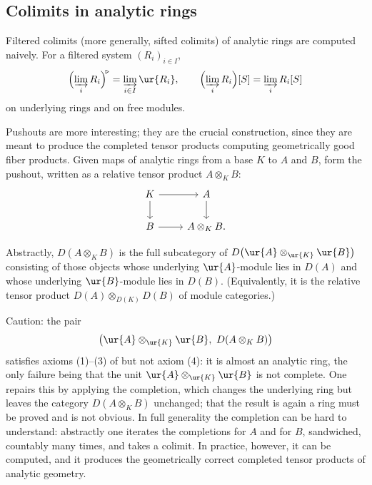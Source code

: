 \subsection{Colimits in analytic rings}

\begin{proposition}
\label{prop:1:filtered-colimits}
Filtered colimits (more generally, sifted colimits) of analytic rings are
computed naively. For a filtered system $(R_i)_{i\in I}$,
\begin{equation*}
\Bigl(\varinjlim_i R_i\Bigr)^{\!\triangleright}=\varinjlim_{i\in I}\ur{R_i},
\qquad
\Bigl(\varinjlim_i R_i\Bigr)[S]=\varinjlim_i R_i[S]
\end{equation*}
on underlying rings and on free modules.
\end{proposition}

Pushouts are more interesting; they are the crucial construction, since they are
meant to produce the completed tensor products computing geometrically good fiber
products. Given maps of analytic rings from a base $K$ to $A$ and $B$, form the
pushout, written as a relative tensor product $A\otimes_K B$:
\[
\begin{tikzcd}
K \arrow[r] \arrow[d] & A \arrow[d] \\
B \arrow[r] & A\otimes_K B.
\end{tikzcd}
\]

\begin{proposition}
\label{prop:1:pushout-derived-category}
Abstractly, $D(A\otimes_K B)$ is the full subcategory of
$D\bigl(\ur{A}\otimes_{\ur{K}}\ur{B}\bigr)$ consisting of those objects whose
underlying $\ur{A}$-module lies in $D(A)$ and whose underlying $\ur{B}$-module
lies in $D(B)$. (Equivalently, it is the relative tensor product
$D(A)\otimes_{D(K)} D(B)$ of module categories.)
\end{proposition}

\begin{remark}
\label{rmk:1:pushout-completion}
Caution: the pair
\begin{equation}
\label{eq:1:pushout-not-analytic}
\bigl(\ur{A}\otimes_{\ur{K}}\ur{B},\ D(A\otimes_K B)\bigr)
\end{equation}
satisfies axioms (1)--(3) of  but not axiom (4): it is
almost an analytic ring, the only failure being that the unit
$\ur{A}\otimes_{\ur{K}}\ur{B}$ is not complete. One repairs this by applying the
completion, which changes the underlying ring but leaves the category $D(A\otimes_K B)$
unchanged; that the result is again a ring must be proved and is not obvious. In
full generality the completion can be hard to understand: abstractly one iterates
the completions for $A$ and for $B$, sandwiched, countably many times, and takes a
colimit. In practice, however, it can be computed, and it produces the
geometrically correct completed tensor products of analytic geometry.
\end{remark}

